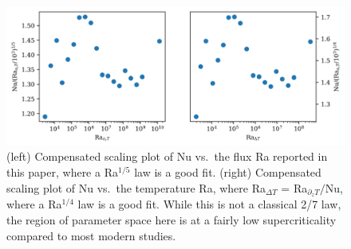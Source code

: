 \begin{figure}[ht!]
\includegraphics[width=\textwidth]{./figs/postscripts/flux_nu_ra_scalings.pdf}
\caption[Flux and Temperature Nu vs.~Ra.]
{
	(left) Compensated scaling plot of Nu vs.~the flux Ra reported in this paper, where a Ra$^{1/5}$ law is a good fit.
	(right) Compensated scaling plot of Nu vs.~the temperature Ra, where Ra$_{\Delta T}$ = Ra$_{\partial_z T}/$Nu, where a Ra$^{1/4}$ law is a good fit.
	While this is not a classical 2/7 law, the region of parameter space here is at a fairly low supercriticality compared to most modern studies.
	\label{fig:flux_nu_ra_scalings} 
}
\end{figure}


